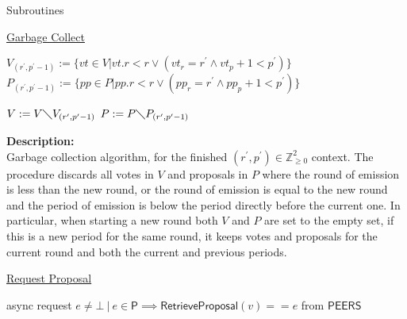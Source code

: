 \documentclass[10pt,a4paper]{article}
\begin{document}
\begin{section}{Subroutines}

\begin{algorithm}[H]
    \caption{\underline{Garbage Collect}}
    \label{algo:garbage-collect}
    \begin{algorithmic}[1]

    \State $V_{(r^\prime,p^\prime-1)} := \{ vt \in V | vt.r < r \lor (vt_r=r^\prime \land vt_p + 1 < p^\prime) \}$
    \State $P_{(r^\prime,p^\prime-1)} := \{ pp \in P | pp.r < r \lor (pp_r=r^\prime \land pp_p + 1 < p^\prime) \}$

    \State $V := V\diagdown V_{(r^\prime,p^\prime-1)}$
    \State $P := P\diagdown P_{(r^\prime,p^\prime-1)}$

    \EndFunction
    \end{algorithmic}
\end{algorithm}

\noindent \textbf{Description:}\\
Garbage collection algorithm, for the finished $(r^\prime,p^\prime)\in\mathbb{Z}_{\ge 0}^2$ context.
The procedure discards all votes in $V$ and proposals in $P$ where the round of emission is less than the
new round, or the round of emission is equal to the new round and the period of emission is below the period
directly before the current one.
In particular, when starting a new round both $V$ and $P$ are set to the empty set,
if this is a new period for the same round, it keeps votes and proposals for the current round
and both the current and previous periods.


\begin{algorithm}[H]
    \caption{\underline{Request Proposal}}
    \label{algo:request-proposal}
    \begin{algorithmic}[1]
        \State async request $e \neq \bot \ | \ e \in \mathsf{P} \implies \mathsf{RetrieveProposal}(v) == e$ from $\mathsf{PEERS}$ 
    \EndFunction
    \end{algorithmic}
\end{algorithm}



\end{section}
\end{document}
